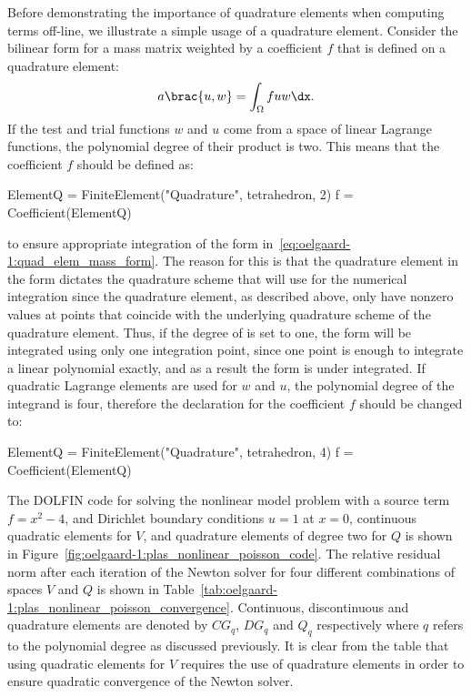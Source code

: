 Before demonstrating the importance of quadrature elements when computing
terms off-line, we illustrate a simple usage of a quadrature element.
Consider the bilinear form for a mass matrix weighted by a coefficient
$f$ that is defined on a quadrature element:
%
\begin{equation}
  a\brac{u, w} = \int_{\Omega} f u w \dx.
\label{eq:oelgaard-1:quad_elem_mass_form}
\end{equation}
%
If the test and trial functions $w$ and $u$ come from a space of linear
Lagrange functions, the polynomial degree of their product is two.
This means that the coefficient $f$ should be defined as:
%
\begin{python}
ElementQ = FiniteElement("Quadrature", tetrahedron, 2)
f = Coefficient(ElementQ)
\end{python}
%
to ensure appropriate integration of the form
in~\eqref{eq:oelgaard-1:quad_elem_mass_form}.  The reason for this is
that the quadrature element in the form dictates the quadrature scheme
that \ffc{} will use for the numerical integration since the quadrature
element, as described above, only have nonzero values at points that
coincide with the underlying quadrature scheme of the quadrature element.
Thus, if the degree of  is set to one, the form will be
integrated using only one integration point, since one point is enough
to integrate a linear polynomial exactly, and as a result the form
is under integrated.  If quadratic Lagrange elements are used for $w$
and $u$, the polynomial degree of the integrand is four, therefore the
declaration for the coefficient $f$ should be changed to:
%
\begin{python}
ElementQ = FiniteElement("Quadrature", tetrahedron, 4)
f = Coefficient(ElementQ)
\end{python}

The DOLFIN code for solving the nonlinear model problem with a
source term $f = x^2 - 4$, and Dirichlet boundary conditions
$u = 1$ at $x = 0$, continuous quadratic elements for $V$,
and quadrature elements of degree two for $Q$ is shown in
Figure~\ref{fig:oelgaard-1:plas_nonlinear_poisson_code}.  The
relative residual norm after each iteration of the Newton solver
for four different combinations of spaces $V$ and $Q$ is shown
in Table~\ref{tab:oelgaard-1:plas_nonlinear_poisson_convergence}.
Continuous, discontinuous and quadrature elements are denoted by $CG_{q}$,
$DG_{q}$ and $Q_{q}$ respectively where $q$ refers to the polynomial
degree as discussed previously.  It is clear from the table that using
quadratic elements for $V$ requires the use of quadrature elements in
order to ensure quadratic convergence of the Newton solver.

